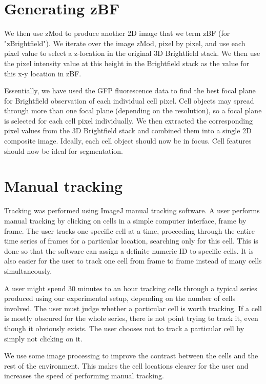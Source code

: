 \section{Generating zBF}

We then use zMod to produce another 2D image that we term zBF (for "zBrightfield"). We iterate over the image zMod, pixel by pixel, and use each pixel value to select a z-location in the original 3D Brightfield stack. We then use the pixel intensity value at this height in the Brightfield stack as the value for this x-y location in zBF.

Essentially, we have used the GFP fluorescence data to find the best focal plane for Brightfield observation of each individual cell pixel. Cell objects may spread through more than one focal plane (depending on the resolution), so a focal plane is selected for each cell pixel individually. We then extracted the corresponding pixel values from the 3D Brightfield stack and combined them into a single 2D composite image. Ideally, each cell object should now be in focus. Cell features should now be ideal for segmentation.

\section{Manual tracking}

Tracking was performed using ImageJ manual tracking software. A user performs manual tracking by clicking on cells in a simple computer interface, frame by frame. The user tracks one specific cell at a time, proceeding through the entire time series of frames for a particular location, searching only for this cell. This is done so that the software can assign a definite numeric ID to specific cells. It is also easier for the user to track one cell from frame to frame instead of many cells simultaneously.

A user might spend 30 minutes to an hour tracking cells through a typical series produced using our experimental setup, depending on the number of cells involved. The user must judge whether a particular cell is worth tracking. If a cell is mostly obscured for the whole series, there is not point trying to track it, even though it obviously exists. The user chooses not to track a particular cell by simply not clicking on it.

We use some image processing to improve the contrast between the cells and the rest of the environment. This makes the cell locations clearer for the user and increases the speed of performing manual tracking.

